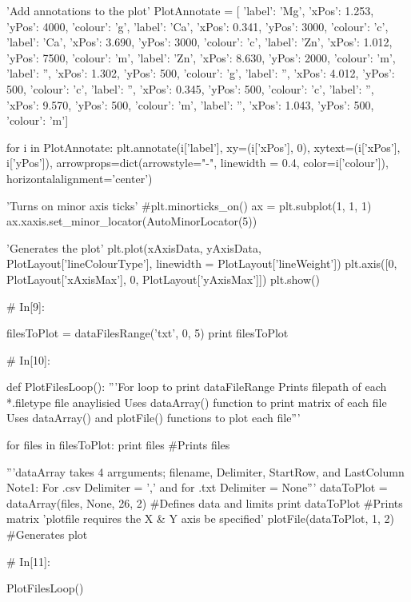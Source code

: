 \documentclass[a4paper,8pt]{article}
\begin{document}
\begin{python}
'Add annotations to the plot'
PlotAnnotate = [
{'label': 'Mg', 'xPos': 1.253, 'yPos': 4000, 'colour': 'g'},
{'label': 'Ca', 'xPos': 0.341, 'yPos': 3000, 'colour': 'c'},
{'label': 'Ca', 'xPos': 3.690, 'yPos': 3000, 'colour': 'c'},
{'label': 'Zn', 'xPos': 1.012, 'yPos': 7500, 'colour': 'm'},
{'label': 'Zn', 'xPos': 8.630, 'yPos': 2000, 'colour': 'm'},
{'label': '', 'xPos': 1.302, 'yPos': 500, 'colour': 'g'},
{'label': '', 'xPos': 4.012, 'yPos': 500, 'colour': 'c'},
{'label': '', 'xPos': 0.345, 'yPos': 500, 'colour': 'c'},
{'label': '', 'xPos': 9.570, 'yPos': 500, 'colour': 'm'},
{'label': '', 'xPos': 1.043, 'yPos': 500, 'colour': 'm'}]

for i in PlotAnnotate:
plt.annotate(i['label'], xy=(i['xPos'], 0),
xytext=(i['xPos'], i['yPos']),
arrowprops=dict(arrowstyle="-", linewidth = 0.4,
color=i['colour']),
horizontalalignment='center')

'Turns on minor axis ticks'
#plt.minorticks_on()
ax = plt.subplot(1, 1, 1)
ax.xaxis.set_minor_locator(AutoMinorLocator(5))

'Generates the plot'
plt.plot(xAxisData, yAxisData,
PlotLayout['lineColourType'], 
linewidth = PlotLayout['lineWeight'])
plt.axis([0, PlotLayout['xAxisMax'], 0, PlotLayout['yAxisMax']])
plt.show()


# In[9]:

filesToPlot = dataFilesRange('txt', 0, 5)
print filesToPlot


# In[10]:

def PlotFilesLoop():
'''For loop to print dataFileRange
Prints filepath of each *.filetype file anaylisied 
Uses dataArray() function to print matrix of each file
Uses dataArray() and plotFile() functions to plot each file'''

for files in filesToPlot:
print files #Prints files

'''dataArray takes 4 arrguments; filename, Delimiter, StartRow, and LastColumn
Note1: For .csv Delimiter = ',' and for .txt Delimiter = None'''
dataToPlot = dataArray(files, None, 26, 2) #Defines data and limits
print dataToPlot #Prints matrix
'plotfile requires the X & Y axis be specified'
plotFile(dataToPlot, 1, 2) #Generates plot


# In[11]:

PlotFilesLoop()

\end{python}
\end{document}
